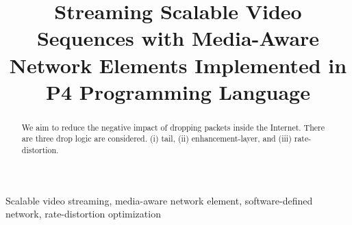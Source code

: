 \documentclass[10pt, conference]{IEEEtran}
\begin{document}
\sloppy

\title{
Streaming Scalable Video Sequences with Media-Aware Network Elements Implemented in P4 Programming Language
}

\author{ 
\vspace{2pt}
}
\maketitle

\begin{abstract}
  We aim to reduce the negative impact of dropping packets inside the Internet. There are three drop logic are considered. (i) tail, (ii) enhancement-layer, and (iii) rate-distortion.
\end{abstract}
\begin{IEEEkeywords}
Scalable video streaming, media-aware network element, software-defined network, rate-distortion optimization
\end{IEEEkeywords}











%
%
%
%




\end{document}
